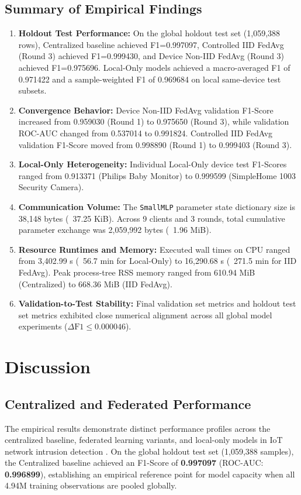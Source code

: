 \documentclass[11pt,a4paper]{article}
\begin{document}
\subsection{Summary of Empirical Findings}
\begin{enumerate}
    \item \textbf{Holdout Test Performance:} On the global holdout test set (1,059,388 rows), Centralized baseline achieved F1=0.997097, Controlled IID FedAvg (Round 3) achieved F1=0.999430, and Device Non-IID FedAvg (Round 3) achieved F1=0.975696. Local-Only models achieved a macro-averaged F1 of 0.971422 and a sample-weighted F1 of 0.969684 on local same-device test subsets.
    \item \textbf{Convergence Behavior:} Device Non-IID FedAvg validation F1-Score increased from 0.959030 (Round 1) to 0.975650 (Round 3), while validation ROC-AUC changed from 0.537014 to 0.991824. Controlled IID FedAvg validation F1-Score moved from 0.998890 (Round 1) to 0.999403 (Round 3).
    \item \textbf{Local-Only Heterogeneity:} Individual Local-Only device test F1-Scores ranged from 0.913371 (Philips Baby Monitor) to 0.999599 (SimpleHome 1003 Security Camera).
    \item \textbf{Communication Volume:} The \texttt{SmallMLP} parameter state dictionary size is 38,148 bytes (~37.25 KiB). Across 9 clients and 3 rounds, total cumulative parameter exchange was 2,059,992 bytes (~1.96 MiB).
    \item \textbf{Resource Runtimes and Memory:} Executed wall times on CPU ranged from 3,402.99 s (~56.7 min for Local-Only) to 16,290.68 s (~271.5 min for IID FedAvg). Peak process-tree RSS memory ranged from 610.94 MiB (Centralized) to 668.36 MiB (IID FedAvg).
    \item \textbf{Validation-to-Test Stability:} Final validation set metrics and holdout test set metrics exhibited close numerical alignment across all global model experiments ($\Delta \text{F1} \le 0.000046$).
\end{enumerate}

\section{Discussion}

\subsection{Centralized and Federated Performance}
The empirical results demonstrate distinct performance profiles across the centralized baseline, federated learning variants, and local-only models in IoT network intrusion detection \cite{ref3, ref4}. On the global holdout test set (1,059,388 samples), the Centralized baseline achieved an F1-Score of \textbf{0.997097} (ROC-AUC: \textbf{0.996899}), establishing an empirical reference point for model capacity when all 4.94M training observations are pooled globally.
\end{document}

